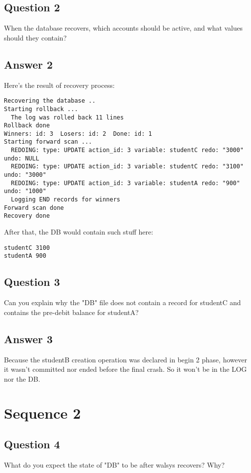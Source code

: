 \documentclass[12pt]{article}
\begin{document}
\subsection*{Question 2} When the database recovers, which accounts should be active, and what values should they contain?

\subsection*{Answer 2} Here's the result of recovery process:
\begin{lstlisting}[numberstyle=\tiny\monaco,
        basicstyle=\small\monaco]
Recovering the database ..
Starting rollback ...
  The log was rolled back 11 lines
Rollback done
Winners: id: 3  Losers: id: 2  Done: id: 1 
Starting forward scan ...
  REDOING: type: UPDATE action_id: 3 variable: studentC redo: "3000" undo: NULL
  REDOING: type: UPDATE action_id: 3 variable: studentC redo: "3100" undo: "3000"
  REDOING: type: UPDATE action_id: 3 variable: studentA redo: "900" undo: "1000"
  Logging END records for winners
Forward scan done
Recovery done
\end{lstlisting}

After that, the DB would contain such stuff here:
\begin{lstlisting}[numberstyle=\tiny\monaco,
        basicstyle=\small\monaco]
studentC 3100
studentA 900
\end{lstlisting}

\subsection*{Question 3} Can you explain why the "DB" file does not contain a record for studentC and contains the pre-debit balance for studentA?

\subsection*{Answer 3} Because the studentB creation operation was declared in begin 2 phase, however it wasn't committed nor ended before the final crash. So it won't be in the LOG nor the DB.

\section*{Sequence 2}

\subsection*{Question 4} What do you expect the state of "DB" to be after wal\-sys recovers? Why?
\end{document}
